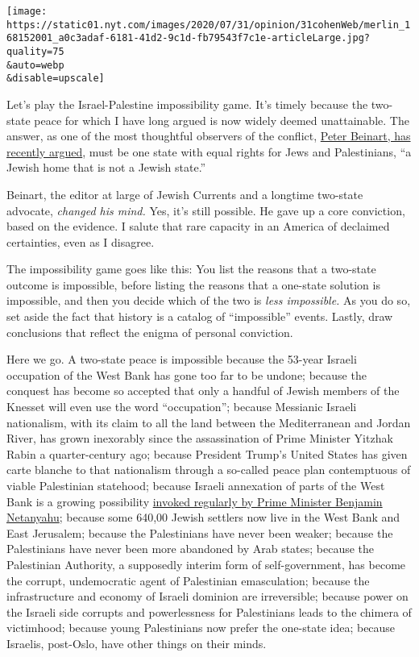 \texttt{[image: https://static01.nyt.com/images/2020/07/31/opinion/31cohenWeb/merlin\_168152001\_a0c3adaf-6181-41d2-9c1d-fb79543f7c1e-articleLarge.jpg?quality=75\\\&auto=webp\\\&disable=upscale]}

Let's play the Israel-Palestine impossibility game. It's timely because
the two-state peace for which I have long argued is now widely deemed
unattainable. The answer, as one of the most thoughtful observers of the
conflict,
\href{https://www.nytimes.com/2020/07/08/opinion/israel-annexation-two-state-solution.html}{Peter
Beinart, has recently argued}, must be one state with equal rights for
Jews and Palestinians, ``a Jewish home that is not a Jewish state.''

Beinart, the editor at large of Jewish Currents and a longtime two-state
advocate, \emph{changed his mind.} Yes, it's still possible. He gave up
a core conviction, based on the evidence. I salute that rare capacity in
an America of declaimed certainties, even as I disagree.

The impossibility game goes like this: You list the reasons that a
two-state outcome is impossible, before listing the reasons that a
one-state solution is impossible, and then you decide which of the two
is \emph{less impossible.} As you do so, set aside the fact that history
is a catalog of ``impossible'' events. Lastly, draw conclusions that
reflect the enigma of personal conviction.

Here we go. A two-state peace is impossible because the 53-year Israeli
occupation of the West Bank has gone too far to be undone; because the
conquest has become so accepted that only a handful of Jewish members of
the Knesset will even use the word ``occupation''; because Messianic
Israeli nationalism, with its claim to all the land between the
Mediterranean and Jordan River, has grown inexorably since the
assassination of Prime Minister Yitzhak Rabin a quarter-century ago;
because President Trump's United States has given carte blanche to that
nationalism through a so-called peace plan contemptuous of viable
Palestinian statehood; because Israeli annexation of parts of the West
Bank is a growing possibility
\href{https://www.nytimes.com/2020/01/28/world/middleeast/israel-west-bank-annex-sovereignty.html}{invoked
regularly by Prime Minister Benjamin Netanyahu}; because some 640,00
Jewish settlers now live in the West Bank and East Jerusalem; because
the Palestinians have never been weaker; because the Palestinians have
never been more abandoned by Arab states; because the Palestinian
Authority, a supposedly interim form of self-government, has become the
corrupt, undemocratic agent of Palestinian emasculation; because the
infrastructure and economy of Israeli dominion are irreversible; because
power on the Israeli side corrupts and powerlessness for Palestinians
leads to the chimera of victimhood; because young Palestinians now
prefer the one-state idea; because Israelis, post-Oslo, have other
things on their minds.

